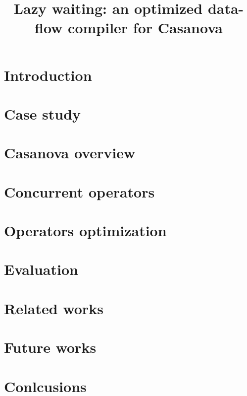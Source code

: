 \documentclass[10pt,a4paper]{article}
\author{}
\title{Lazy waiting: an optimized data-flow compiler for Casanova}
\date{}
\begin{document}
\maketitle

\section{Introduction}
\label{sec:introduction}


\section{Case study}
\label{sec:problem_statement}


\section{Casanova overview}
\label{sec:casanova}


\section{Concurrent operators}
\label{sec:idea}


\section{Operators optimization}
\label{sec:details}


\section{Evaluation}
\label{sec:evaluation}


\section{Related works}
\label{sec:related_works}


\section{Future works}
\label{sec:future_works}


\section{Conlcusions}
\label{sec:conclusions}

\end{document}
